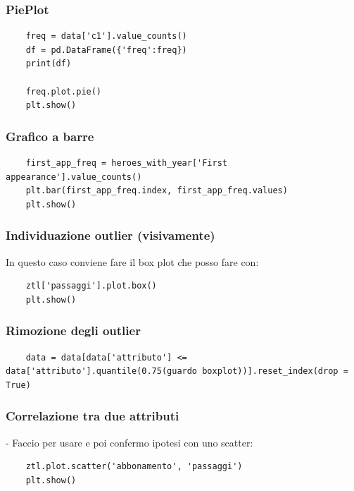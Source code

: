 \documentclass{article}
\begin{document}
\subsubsection*{PiePlot}

\begin{lstlisting}
    freq = data['c1'].value_counts()
    df = pd.DataFrame({'freq':freq})
    print(df)

    freq.plot.pie()
    plt.show()
\end{lstlisting}

\subsubsection*{Grafico a barre}
\begin{lstlisting}
    first_app_freq = heroes_with_year['First appearance'].value_counts()
    plt.bar(first_app_freq.index, first_app_freq.values)
    plt.show()
\end{lstlisting}

\subsubsection*{Individuazione outlier (visivamente)}

In questo caso conviene fare il box plot che posso fare con:

\begin{lstlisting}
    ztl['passaggi'].plot.box()
    plt.show()
\end{lstlisting}

\subsubsection*{Rimozione degli outlier}

\begin{lstlisting}
    data = data[data['attributo'] <= data['attributo'].quantile(0.75(guardo boxplot))].reset_index(drop = True)
\end{lstlisting}

\subsubsection*{Correlazione tra due attributi}

- Faccio  per usare  e poi confermo ipotesi con uno scatter:

\begin{lstlisting}
    ztl.plot.scatter('abbonamento', 'passaggi')
    plt.show()
\end{lstlisting}
\end{document}
